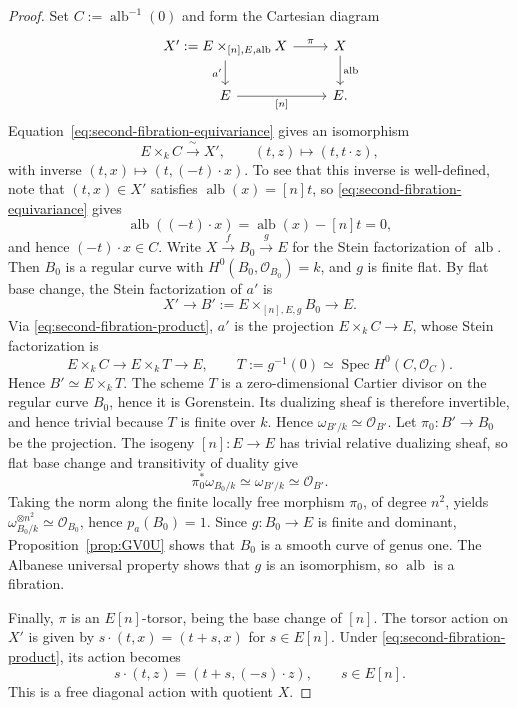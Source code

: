 \documentclass[10pt,abstract=true]{scrartcl}
\numberwithin{equation}{section}
\theoremstyle{definition}
\theoremstyle{remark}
\DeclareMathOperator\alb{alb}
\begin{document}
\begin{proof}
  Set $C:=\alb^{-1}(0)$ and form the Cartesian diagram
  \[
    \begin{tikzcd}
      X':=E\times_{[n],E,\alb}X \ar[r,"\pi"] \ar[d,"a'"']
        & X \ar[d,"\alb"]\\
      E \ar[r,"{[n]}"'] & E.
    \end{tikzcd}
  \]
  Equation~\eqref{eq:second-fibration-equivariance} gives an isomorphism
  \begin{equation}\label{eq:second-fibration-product}
    E\times_kC\xrightarrow{\ \sim\ }X',
    \qquad (t,z)\longmapsto(t,t\cdot z),
  \end{equation}
  with inverse $(t,x)\mapsto(t,(-t)\cdot x)$.
  To see that this inverse is well-defined, note that $(t,x)\in X'$ satisfies $\alb(x)=[n]t$, so \eqref{eq:second-fibration-equivariance} gives
  \[
    \alb((-t)\cdot x)=\alb(x)-[n]t=0,
  \]
  and hence $(-t)\cdot x\in C$.
  Write $X\xrightarrow{f}B_0\xrightarrow{g}E$ for the Stein factorization of $\alb$.
  Then $B_0$ is a regular curve with $H^0(B_0,\mathcal O_{B_0})=k$, and $g$ is finite flat.
  By flat base change, the Stein factorization of $a'$ is
  \[
    X'\longrightarrow B':=E\times_{[n],E,g}B_0\longrightarrow E.
  \]
  Via \eqref{eq:second-fibration-product}, $a'$ is the projection
  $E\times_kC\to E$, whose Stein factorization is
  \[
    E\times_kC\longrightarrow E\times_kT\longrightarrow E,
    \qquad
    T:=g^{-1}(0)\simeq\operatorname{Spec}H^0(C,\mathcal O_C).
  \]
  Hence $B'\simeq E\times_kT$.
  The scheme $T$ is a zero-dimensional Cartier divisor on the regular curve $B_0$, hence it is Gorenstein.
  Its dualizing sheaf is therefore invertible, and hence trivial because $T$ is finite over $k$.
  Hence $\omega_{B'/k}\simeq\mathcal O_{B'}$.
  Let $\pi_0\colon B'\to B_0$ be the projection.
  The isogeny $[n]\colon E\to E$ has trivial relative dualizing sheaf, so flat base change and transitivity of duality give
  \[
    \pi_0^*\omega_{B_0/k}\simeq\omega_{B'/k}\simeq\mathcal O_{B'}.
  \]
  Taking the norm along the finite locally free morphism $\pi_0$, of degree $n^2$, yields $\omega_{B_0/k}^{\otimes n^2}\simeq\mathcal O_{B_0}$, hence $p_a(B_0)=1$.
  Since $g\colon B_0\to E$ is finite and dominant, Proposition~\ref{prop:GV0U} shows that $B_0$ is a smooth curve of genus one.
  The Albanese universal property shows that $g$ is an isomorphism, so $\alb$ is a fibration.

  Finally, $\pi$ is an $E[n]$-torsor, being the base change of $[n]$.
  The torsor action on $X'$ is given by $s\cdot(t,x)=(t+s,x)$ for $s\in E[n]$.
  Under \eqref{eq:second-fibration-product}, its action becomes
  \[
    s\cdot(t,z)=(t+s,(-s)\cdot z),
    \qquad s\in E[n].
  \]
  This is a free diagonal action with quotient $X$.
\end{proof}
\end{document}
